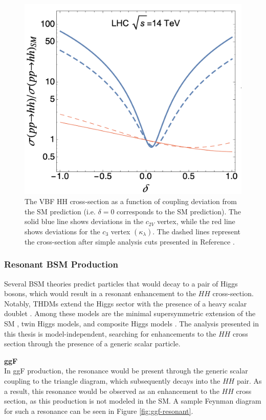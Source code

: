 \begin{figure}[!ht]
    \centering
    \includegraphics[width=.7\textwidth]{chapters/chapter1_theory/images/coupling_xsec.png}
    \caption[The VBF HH cross-section as a function of coupling deviation from the \gls{SM} prediction.]{The VBF HH cross-section as a function of coupling deviation from the \gls{SM} prediction (i.e. $\delta=0$ corresponds to the \gls{SM} prediction). The solid blue line shows deviations in the $c_{2V}$ vertex, while the red line shows deviations for the $c_{3}$ vertex $(\kappa_\lambda)$. The dashed lines represent the cross-section after simple analysis cuts presented in Reference \cite{vbfhh}.}
    \label{fig:c2v-xsec}
\end{figure}



\subsubsection{Resonant BSM Production}

Several \gls{BSM} theories predict particles that would decay to a pair of Higgs bosons, which would result in a resonant enhancement to the $HH$ cross-section. Notably, \glspl{THDM} extend the Higgs sector with the presence of a heavy scalar doublet \cite{THDM}. Among these models are the minimal supersymmetric extension of the \gls{SM} \cite{mssm}, twin Higgs models, and composite Higgs models \cite{compositeHiggs}. The analysis presented in this thesis is model-independent, searching for enhancements to the $HH$ cross section through the presence of a generic scalar particle.

\noindent\textbf{\gls{ggF}}\\
\indent In \gls{ggF} production, the resonance would be present through the generic scalar coupling to the triangle diagram, which subsequently decays into the $HH$ pair. As a result, this resonance would be observed as an enhancement to the $HH$ cross section, as this production is not modeled in the \gls{SM}. A sample Feynman diagram for such a resonance can be seen in Figure \ref{fig:ggf-resonant}.


